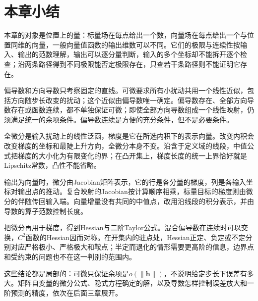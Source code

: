 \FloatBarrier
\section{本章小结}
\label{sec:multivariate-differentiation-chapter-summary}

本章的对象是位置上的量：标量场在每点给出一个数，向量场在每点给出一个与位置同维的向量，一般向量值函数的输出维数可以不同。它们的极限与连续性按输入、输出的范数理解，输出可以逐分量判断，输入的多个坐标却不能拆开逐个检查；沿两条路径得到不同极限能否定极限存在，只查若干条路径则不能证明它存在。

偏导数和方向导数只考察固定的直线。可微要求所有小扰动共用一个线性近似，包括方向随步长改变的扰动；这个近似由偏导数唯一确定。偏导数存在、全部方向导数存在或函数连续，都不单独保证可微；即使全部方向导数组成一个线性映射，仍须满足统一的余项条件。偏导数连续是方便的充分条件，但不是必要条件。

全微分是输入扰动上的线性泛函，梯度是它在所选内积下的表示向量。改变内积会改变梯度的坐标和最陡上升方向，全微分本身不变。沿含于定义域的线段，中值公式把梯度的大小化为有限变化的界；在凸开集上，梯度长度的统一上界恰好就是Lipschitz常数，凸性不能省略。

输出为向量时，微分由Jacobian矩阵表示，它的行是各分量的梯度，列是各输入坐标对输出点的推动。复合映射的Jacobian按计算顺序相乘，标量目标的梯度则由微分的伴随传回输入端。向量增量没有共同的中值点，改用沿线段的积分表示，并由导数的算子范数控制长度。

把微分再用于梯度，得到Hessian与二阶Taylor公式。混合偏导数在连续时可以交换，$C^2$函数的Hessian因而对称。在开集内的驻点处，Hessian正定、负定或不定分别对应严格极小、严格极大和鞍点；半定而退化的情形需要更高阶的信息，边界点和受约束的问题也不在这一判别的范围内。

这些结论都是局部的：可微只保证余项是$o(\lVert\bm h\rVert)$，不说明给定步长下误差有多大。矩阵自变量的微分公式、隐式方程确定的解，以及导数怎样控制误差放大和一阶预测的精度，依次在后面三章展开。
